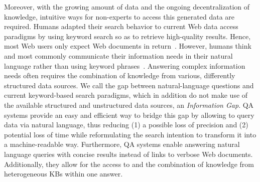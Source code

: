 Moreover, with the growing amount of data and the ongoing decentralization of knowledge, intuitive ways for non-experts to access this generated data are required. 
Humans adapted their search behavior to current Web data access paradigms by using keyword search so as to retrieve high-quality results. Hence, most Web users only expect Web documents in return~\cite{ilprints361}.
However, humans think and most commonly communicate their information needs  in their natural language rather than using keyword phrases~\cite{woods1973progress}. 
Answering complex information needs often requires the combination of knowledge from various, differently structured data sources.
We call the gap between natural-language questions and current keyword-based search paradigms, which in addition do not make use of the available structured and unstructured data sources, an \emph{Information Gap}.
\ac{QA} systems provide an easy and efficient way to bridge this gap by allowing to query data via natural language, thus reducing (1) a possible loss of precision and (2) potential loss of time while reformulating the search intention to transform it into a machine-readable way.
Furthermore, QA systems enable answering natural language queries with concise results instead of  links to verbose Web documents. 
Additionally, they allow for the access  to and the combination of knowledge from heterogeneous \ac{KB}s within one answer.

